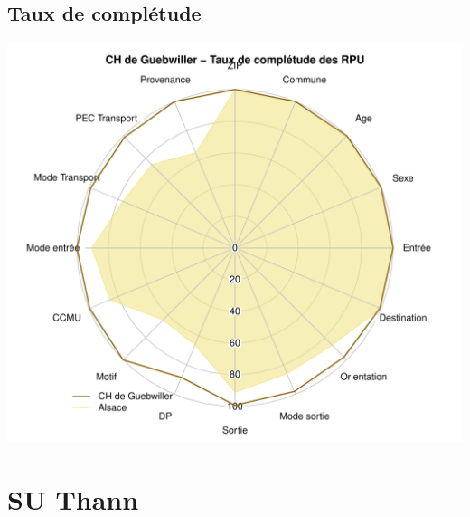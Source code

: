 \documentclass[12pt,english,french,twoside]{book}\usepackage[]{graphicx}\usepackage[]{color}
\makeatletter
\def\maxwidth{ %
  \ifdim\Gin@nat@width>\linewidth
    \linewidth
  \else
    \Gin@nat@width
  \fi
}
\newenvironment{knitrout}{}{} %
\makeatother
\begin{document}
% 
% 
% 
% 

\section*{Taux de complétude}


\begin{knitrout}
\color{fgcolor}
\includegraphics[width=\maxwidth]{figure/compl_geb2} 

\end{knitrout}


\chapter{SU Thann}
\end{document}
